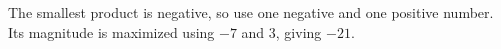 The smallest product is negative, so use one negative and one positive number. Its magnitude is maximized using $-7$ and $3$, giving $\boxed{-21}$.
